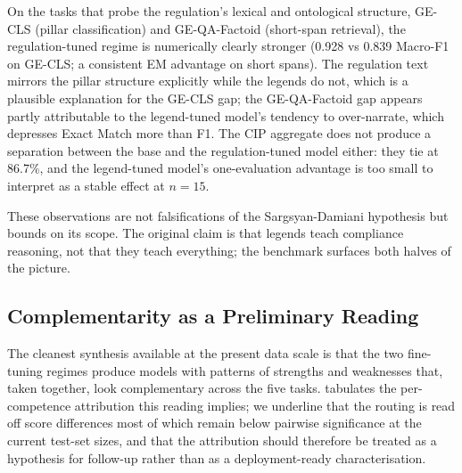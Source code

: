 \documentclass[pdflatex, sn-apa]{sn-jnl}%
\theoremstyle{thmstyleone}%
\theoremstyle{thmstyletwo}%
\theoremstyle{thmstylethree}%
\begin{document}
On the tasks that probe the regulation's lexical and ontological
structure, GE-CLS (pillar classification) and GE-QA-Factoid
(short-span retrieval), the regulation-tuned regime is numerically
clearly stronger (0.928 vs 0.839 Macro-F1 on GE-CLS; a consistent EM
advantage on short spans). The regulation text mirrors the pillar
structure explicitly while the legends do not, which is a plausible
explanation for the GE-CLS gap; the GE-QA-Factoid gap appears partly
attributable to the legend-tuned model's tendency to over-narrate,
which depresses Exact Match more than F1. The CIP aggregate does not
produce a separation between the base and the regulation-tuned model
either: they tie at 86.7\%, and the legend-tuned model's one-evaluation
advantage is too small to interpret as a stable effect at $n=15$.

These observations are not falsifications of the Sargsyan-Damiani
hypothesis but bounds on its scope. The original claim is that legends
teach compliance reasoning, not that they teach everything; the
benchmark surfaces both halves of the picture.

\subsection{Complementarity as a Preliminary Reading}
\label{sec:disc:complementarity}

The cleanest synthesis available at the present data scale is that the
two fine-tuning regimes produce models with patterns of strengths and
weaknesses that, taken together, look complementary across the five
tasks.  tabulates the per-competence
attribution this reading implies; we underline that the routing is
read off score differences most of which remain below pairwise
significance at the current test-set sizes, and that the attribution
should therefore be treated as a hypothesis for follow-up rather than
as a deployment-ready characterisation.
\end{document}
